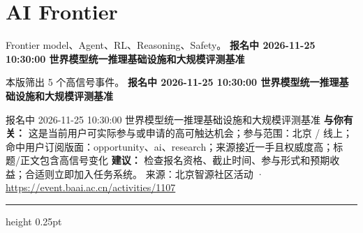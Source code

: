 \documentclass[10.5pt]{ctexart}
\begin{document}
\section*{AI Frontier}
{\color{ormuted} Frontier model、Agent、RL、Reasoning、Safety。}
\vspace{2mm}
{\LARGE\bfseries 报名中 2026-11-25 10:30:00 世界模型统一推理基础设施和大规模评测基准}\par
\vspace{1mm}
{\color{ormuted} 本版筛出 5 个高信号事件。}
\vspace{3mm}
{\Large\bfseries 报名中 2026-11-25 10:30:00 世界模型统一推理基础设施和大规模评测基准}\par
报名中 2026-11-25 10:30:00 世界模型统一推理基础设施和大规模评测基准
\textbf{与你有关：} 这是当前用户可实际参与或申请的高可触达机会；参与范围：北京 / 线上；命中用户订阅版面：opportunity、ai、research；来源接近一手且权威度高；标题/正文包含高信号变化
\textbf{建议：} 检查报名资格、截止时间、参与形式和预期收益；合适则立即加入任务系统。
{\footnotesize\color{ormuted} 来源：北京智源社区活动 · \url{https://event.baai.ac.cn/activities/1107}}
\vspace{4mm}
\hrule height 0.25pt
\vspace{3mm}
\end{document}
